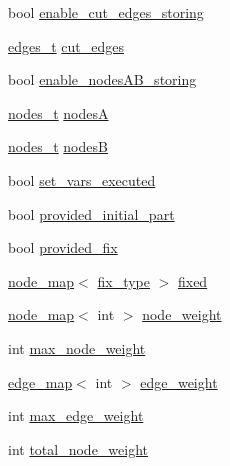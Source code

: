 \begin{DoxyCompactItemize}
\item 
bool \mbox{\hyperlink{classfm__partition_a806c9f5cb781b8ce662d2a3373433777}{enable\+\_\+cut\+\_\+edges\+\_\+storing}}
\item 
\mbox{\hyperlink{edge_8h_a8f9587479bda6cf612c103494b3858e3}{edges\+\_\+t}} \mbox{\hyperlink{classfm__partition_ad71b58a8f73cc834d49304252fb4a288}{cut\+\_\+edges}}
\item 
bool \mbox{\hyperlink{classfm__partition_a2e308857dde9405bc3c6b911218bcda1}{enable\+\_\+nodes\+A\+B\+\_\+storing}}
\item 
\mbox{\hyperlink{edge_8h_a22ac17689106ba21a84e7bc54d1199d6}{nodes\+\_\+t}} \mbox{\hyperlink{classfm__partition_acdcb82ae253e8eaf75a7efca3ca2b377}{nodesA}}
\item 
\mbox{\hyperlink{edge_8h_a22ac17689106ba21a84e7bc54d1199d6}{nodes\+\_\+t}} \mbox{\hyperlink{classfm__partition_a3616b858b66682c528365a4803a4efad}{nodesB}}
\item 
bool \mbox{\hyperlink{classfm__partition_a58edb78c4da479cd790da1eed1a30eab}{set\+\_\+vars\+\_\+executed}}
\item 
bool \mbox{\hyperlink{classfm__partition_a38c67abb32d7ade03b68f0a7ed9f1c6d}{provided\+\_\+initial\+\_\+part}}
\item 
bool \mbox{\hyperlink{classfm__partition_a0aca0fa4fcaba284d61c745d17022f8d}{provided\+\_\+fix}}
\item 
\mbox{\hyperlink{classnode__map}{node\+\_\+map}}$<$ \mbox{\hyperlink{classfm__partition_a63693cd93d587dca3d1842f831cd1c55}{fix\+\_\+type}} $>$ \mbox{\hyperlink{classfm__partition_a3b04658dbb5b27ddd20194ff74a71082}{fixed}}
\item 
\mbox{\hyperlink{classnode__map}{node\+\_\+map}}$<$ int $>$ \mbox{\hyperlink{classfm__partition_ae1ba643b4bd6721075ab7b608bcf3cd6}{node\+\_\+weight}}
\item 
int \mbox{\hyperlink{classfm__partition_a8591f5eddac01679e1da3d835eae1cf6}{max\+\_\+node\+\_\+weight}}
\item 
\mbox{\hyperlink{classedge__map}{edge\+\_\+map}}$<$ int $>$ \mbox{\hyperlink{classfm__partition_adfe6147ba3f9c785f613b472f950595f}{edge\+\_\+weight}}
\item 
int \mbox{\hyperlink{classfm__partition_a5b37b4ac8d96236f274a57a46d653e25}{max\+\_\+edge\+\_\+weight}}
\item 
int \mbox{\hyperlink{classfm__partition_a25651e3f78ddbc418ea978ca6b28e0e0}{total\+\_\+node\+\_\+weight}}
\item 

\end{DoxyCompactItemize}
